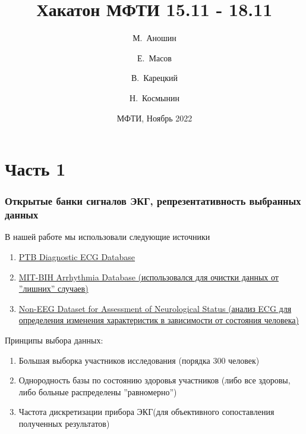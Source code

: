 \documentclass[xcolor=table]{beamer}
\title[Хакатон МФТИ 15.11 - 18.11]{Хакатон МФТИ 15.11 - 18.11}
\author[М. Анош, Е. Мас, В. Кар, Н. Косм] 
{М.~Аношин\inst{1} \and Е.~Масов\inst{1} \and В.~Карецкий\inst{1} \and Н.~Космынин\inst{1}}
\date[18.11.2022] 
{МФТИ, Ноябрь 2022}
\begin{document}
\frame{\titlepage}

\section{Часть 1}
\begin{frame}\frametitle{Открытые банки сигналов ЭКГ, репрезентативность выбранных данных}

В нашей работе мы использовали следующие источники

\begin{enumerate} 
    \item \href{https://www.physionet.org/content/ptbdb/1.0.0/}{PTB Diagnostic ECG Database}
    \item \href{https://www.physionet.org/content/mitdb/1.0.0/}{MIT-BIH Arrhythmia Database (использовался для очистки данных от ''лишних'' случаев)}
    \item \href{https://www.physionet.org/content/noneeg/1.0.0/}{Non-EEG Dataset for Assessment of Neurological Status (анализ ECG для определения изменения характеристик в зависимости от состояния человека)}
    
\end{enumerate}

Принципы выбора данных: 
\begin{enumerate} 
    \item Большая выборка участников исследования
    (порядка $300$ человек)
    \item Однородность базы по состоянию здоровья участников 
    (либо все здоровы, либо больные распределены ''равномерно'')
    \item Частота дискретизации прибора ЭКГ(для объективного сопоставления полученных результатов)
\end{enumerate}

\end{frame}
\end{document}
